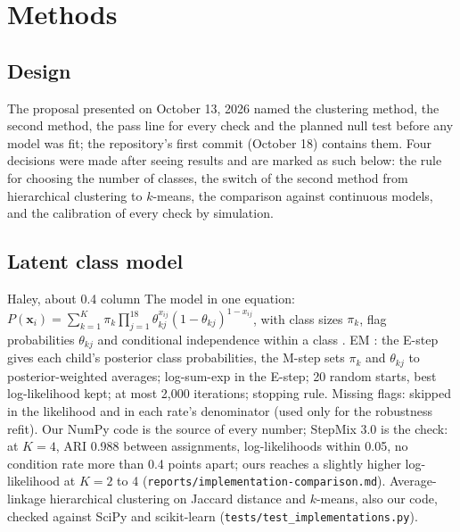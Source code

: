 \section{Methods}
\label{sec:methods}

\subsection{Design}
The proposal presented on October 13, 2026 named the clustering method, the second method, the pass line for every check and the planned null test before any model was fit; the repository's first commit (October 18) contains them. Four decisions were made after seeing results and are marked as such below: the rule for choosing the number of classes, the switch of the second method from hierarchical clustering to $k$-means, the comparison against continuous models, and the calibration of every check by simulation.

\subsection{Latent class model}
\label{sec:lca}
\begin{stub}{Haley, about 0.4 column}
The model in one equation: $P(\mathbf{x}_i)=\sum_{k=1}^{K}\pi_k\prod_{j=1}^{18}\theta_{kj}^{x_{ij}}(1-\theta_{kj})^{1-x_{ij}}$, with class sizes $\pi_k$, flag probabilities $\theta_{kj}$ and conditional independence within a class \citep{lazarsfeld1968,goodman1974}. EM \citep{dempster1977}: the E-step gives each child's posterior class probabilities, the M-step sets $\pi_k$ and $\theta_{kj}$ to posterior-weighted averages; log-sum-exp in the E-step; 20 random starts, best log-likelihood kept; at most 2,000 iterations; stopping rule. Missing flags: skipped in the likelihood and in each rate's denominator (used only for the robustness refit). Our NumPy code is the source of every number; StepMix 3.0 \citep{morin2025} is the check: at $K=4$, ARI 0.988 between assignments, log-likelihoods within 0.05, no condition rate more than 0.4 points apart; ours reaches a slightly higher log-likelihood at $K=2$ to 4 (\texttt{reports/implementation-comparison.md}). Average-linkage hierarchical clustering on Jaccard distance and $k$-means, also our code, checked against SciPy and scikit-learn (\texttt{tests/test\_implementations.py}).
\end{stub}

